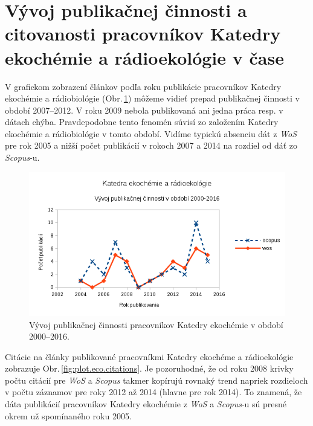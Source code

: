 \section{Vývoj publikačnej činnosti a citovanosti pracovníkov Katedry ekochémie
  a rádioekológie v čase}

V grafickom zobrazení článkov podľa roku publikácie pracovníkov Katedry
ekochémie a rádiobiológie (Obr.\,\ref{fig:plot.eco.publications}) môžeme vidieť
prepad publikačnej činnosti v období 2007--2012. V roku 2009 nebola publikovaná
ani jedna práca resp. v dátach chýba. Pravdepodobne tento fenomén súvisí zo
založením Katedry ekochémie a rádiobiológie v tomto období. Vidíme typickú
absenciu dát z \emph{WoS} pre rok 2005 a nižší počet publikácií v rokoch 2007 a 2014 na
rozdiel od dáť zo \emph{Scopus}-u.

\begin{figure}
  \centering
  \includegraphics[width=\textwidth]{obr/plot-eco-publications.png}
  \caption{Vývoj publikačnej činnosti  pracovníkov Katedry ekochémie v období 2000--2016.}
  \label{fig:plot.eco.publications}
\end{figure}

Citácie na články publikované pracovníkmi Katedry ekochéme a rádioekológie
zobrazuje Obr.\,\ref{fig:plot.eco.citations}. Je pozoruhodné, že od roku 2008
krivky počtu citácií pre \emph{WoS} a \emph{Scopus} takmer kopírujú rovnaký
trend napriek rozdieloch v počtu záznamov pre roky 2012 až 2014 (hlavne pre rok
2014). To znamená, že dáta publikácií pracovníkov Katedry ekochémie z \emph{WoS} a
\emph{Scopus}-u sú presné okrem už spomínaného roku 2005.

